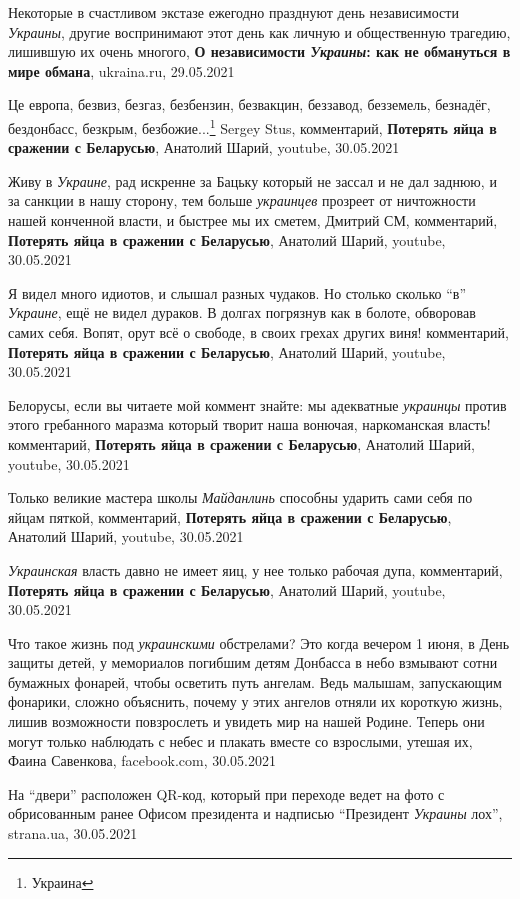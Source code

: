 Некоторые в счастливом экстазе ежегодно празднуют день независимости
\emph{Украины}, другие воспринимают этот день как личную и общественную
трагедию, лишившую их очень многого, \textbf{О независимости \emph{Украины}:
как не обмануться в мире обмана}, ukraina.ru, 29.05.2021

Це европа, безвиз, безгаз, безбензин, безвакцин, беззавод, безземель, безнадёг,
бездонбасс, безкрым, безбожие...\footnote{Украина} Sergey Stus, комментарий,
\textbf{Потерять яйца в сражении с Беларусью}, Анатолий Шарий, youtube,
30.05.2021 

Живу в \emph{Украине}, рад искренне за Бацьку который не зассал и не дал
заднюю, и за санкции в нашу сторону, тем больше \emph{украинцев} прозреет от
ничтожности нашей конченной власти, и быстрее мы их сметем, Дмитрий СМ,
комментарий, \textbf{Потерять яйца в сражении с Беларусью}, Анатолий Шарий,
youtube, 30.05.2021

Я видел много идиотов, и слышал разных чудаков. Но столько сколько \enquote{в}
\emph{Украине}, ещё не видел дураков. В долгах погрязнув как в болоте,
обворовав самих себя. Вопят, орут всё о свободе, в своих грехах других виня!
комментарий, \textbf{Потерять яйца в сражении с Беларусью}, Анатолий Шарий,
youtube, 30.05.2021

Белорусы, если вы читаете мой коммент знайте: мы адекватные \emph{украинцы}
против этого гребанного маразма который творит наша вонючая, наркоманская
власть!  комментарий, \textbf{Потерять яйца в сражении с Беларусью}, Анатолий
Шарий, youtube, 30.05.2021

Только великие мастера школы \emph{Майданлинь} способны ударить сами себя по
яйцам пяткой, комментарий, \textbf{Потерять яйца в сражении с Беларусью},
Анатолий Шарий, youtube, 30.05.2021

\emph{Украинская} власть давно не имеет яиц, у нее только рабочая дупа,
комментарий, \textbf{Потерять яйца в сражении с Беларусью}, Анатолий Шарий,
youtube, 30.05.2021

Что такое жизнь под \emph{украинскими} обстрелами? Это когда вечером 1 июня, в
День защиты детей, у мемориалов погибшим детям Донбасса в небо взмывают сотни
бумажных фонарей, чтобы осветить путь ангелам. Ведь малышам, запускающим
фонарики, сложно объяснить, почему у этих ангелов отняли их короткую жизнь,
лишив возможности повзрослеть и увидеть мир на нашей Родине. Теперь они могут
только наблюдать с небес и плакать вместе со взрослыми, утешая их, Фаина
Савенкова, facebook.com, 30.05.2021

На \enquote{двери} расположен QR-код, который при переходе ведет на фото с
обрисованным ранее Офисом президента и надписью \enquote{Президент
\emph{Украины} лох}, strana.ua, 30.05.2021

